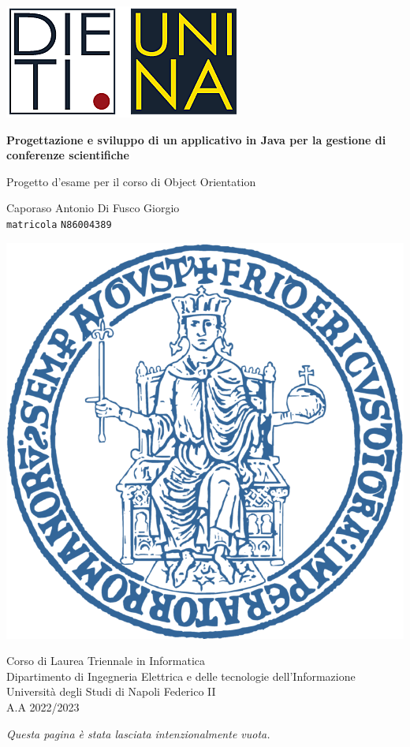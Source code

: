 \documentclass[a4paper, oneside, 12pt]{book}
\begin{document}
\begin{titlepage}
\begin{center}

\includegraphics[scale=0.6]{Immagini/logo_dieti.png}
\vspace*{1cm}

{\Huge{\textbf{Progettazione e sviluppo di un applicativo in Java per la gestione di conferenze scientifiche}}}

\vspace{1cm}

{\Large Progetto d'esame per il corso di Object Orientation}


\vfill

{\Large Caporaso Antonio} \qquad \Large{Di Fusco Giorgio}\\
\texttt{matricola} \qquad \texttt{N86004389}

\vspace{1cm}

\includegraphics[scale=0.6]{Immagini/LogoUnina.png}

\vspace{1cm}
\begin{small}
Corso di Laurea Triennale in Informatica\\
Dipartimento di Ingegneria Elettrica e delle tecnologie dell'Informazione\\
Università degli Studi di Napoli Federico II\\
\textsc{A.A 2022/2023}
\end{small}
\end{center}
\end{titlepage}
\newpage
\textit{Questa pagina è stata lasciata intenzionalmente vuota.}
\newpage
\tableofcontents
\listoffigures
\listoftables
\end{document}
